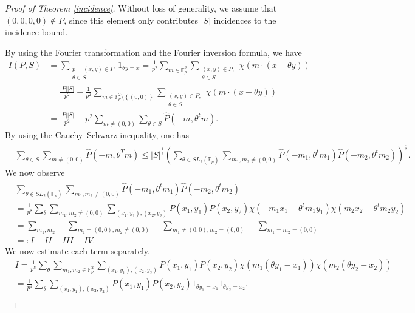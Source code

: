 \documentclass[11pt]{article}
\def\Fbb{\mathbb{F}}
\def\SL{SL}
\def\l({\left(}
\def\r){\right)}
\def\lv{\left\vert}
\def\rv{\right\vert}
\def\lo{\left\{}
\def\ro{\right\}}
\begin{document}
\begin{proof}[Proof of Theorem \ref{incidence}]
Without loss of generality, we assume that $(0, 0, 0, 0)\not\in P$, since this element only contributes $|S|$ incidences to the incidence bound. 

    By using the Fourier transformation and the Fourier inversion formula, we have 
    \begin{align*}
        I(P,S) & = \sum_{\substack{p=(x,y )\in P \\ \theta \in S}} 1_{\theta y=x} =\frac{1}{p^2} \sum_{m\in \Fbb_p^2} \sum_{\substack{(x,y)\in P, \\ \theta \in S}} \chi \l( m\cdot \l( x-\theta y \r) \r) \\
        & = \frac{\lv P\rv \lv S\rv}{p^2} + \frac{1}{p^2} \sum_{ m\in \Fbb_p^2 \setminus \lo (0,0)\ro } \sum_{\substack{ (x,y)\in P ,\\ \theta \in S }} \chi \l( m \cdot \l( x -\theta y \r) \r) \\
        & = \frac{\lv P\rv \lv S\rv}{p^2} + p^2\sum_{m\ne (0, 0)} \sum_{\theta \in S} \widehat{P} \l( -m,\theta^t m\r).
    \end{align*}
By using the Cauchy--Schwarz inequality, one has 
\begin{align*}
    &\sum_{\theta\in S}\sum_{m\ne (0, 0)}\widehat{P}(-m, \theta^Tm)\le |S|^{\frac{1}{2}}\left(\sum_{\theta\in \SL_2 \l( \Fbb_p \r)}\sum_{m_1, m_2\ne (0, 0)}\widehat{P}(-m_1, \theta^tm_1)\overline{\widehat{P}(-m_2, \theta^tm_2)}\right)^{\frac{1}{2}}.
\end{align*}
We now observe 
\begin{align*}
    &\sum_{\theta\in \SL_2 \l( \Fbb_p \r)}\sum_{m_1, m_2\ne (0, 0)}\widehat{P}(-m_1, \theta^tm_1)\overline{\widehat{P}(-m_2, \theta^tm_2)}\\&=\frac{1}{p^8}\sum_{\theta}\sum_{m_1, m_2\ne (0, 0)}\sum_{(x_1, y_1), (x_2, y_2)}P(x_1, y_1)P(x_2, y_2)\chi(-m_1x_1+\theta^tm_1y_1)\chi(m_2x_2-\theta^tm_2y_2)\\
    &=\sum_{m_1, m_2}-\sum_{m_1=(0, 0), m_2\ne (0, 0)}-\sum_{m_1\ne (0, 0), m_2=(0, 0)}-\sum_{m_1=m_2=(0, 0)}\\
    &=:I-II-III-IV.
\end{align*}
We now estimate each term separately. 
\begin{align*}
    &I=\frac{1}{p^8}\sum_{\theta}\sum_{m_1, m_2\in \mathbb{F}_p^2}\sum_{(x_1, y_1), (x_2, y_2)}P(x_1, y_1)P(x_2, y_2)\chi(m_1(\theta y_1-x_1))\chi(m_2(\theta y_2-x_2))\\
    &=\frac{1}{p^4}\sum_{\theta}\sum_{(x_1, y_1), (x_2, y_2)}P(x_1, y_1)P(x_2, y_2)1_{\theta y_1=x_1}1_{\theta y_2=x_2}.\\

\end{align*}
\end{proof}
\end{document}
